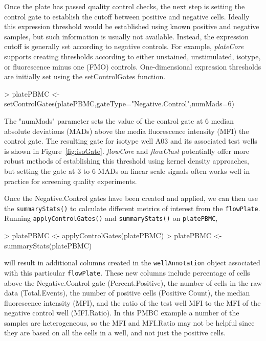 \documentclass[12pt]{article}
\newcommand{\Rfunction}[1]{{\texttt{#1()}}}
\newcommand{\Rclass}[1]{{\texttt{#1}}}
\newcommand{\Robject}[1]{{\texttt{#1}}}
\newcommand{\Rpackage}[1]{{\textit{#1}}}
\begin{document}
\clearpage
Once the plate has passed quality control
checks, the next step is setting the control gate to establish the cutoff between positive and negative cells.
Ideally this expression threshold would be established using known positive and negative samples, but such information is
usually not available. Instead, the expression cutoff is generally set according to negative controls. 
For example, \Rpackage{plateCore} supports creating thresholds according to either unstained, unstimulated, isotype, 
or fluorescence minus one (FMO) controls. One-dimensional expression thresholds are initially set using
the setControlGates function. 
\begin{Schunk}
\begin{Sinput}
> platePBMC <- setControlGates(platePBMC,gateType="Negative.Control",numMads=6)
\end{Sinput}
\end{Schunk}
The "numMads" parameter sets the value of the control gate at 6 median absolute deviations (MADs) above 
the media fluorescence intensity (MFI) the control gate. The resulting gate for isotype well A03 and its
associated test wells is shown in Figure~\ref{fig:isoGate}.
\Rpackage{flowCore} and \Rpackage{flowClust} potentially offer
more robust methods of establishing this threshold using kernel density approaches, but setting the
gate at 3 to 6 MADs on linear scale signals often works well in practice for screening quality experiments.

Once the Negative.Control gates have been created and applied, we can then use the \Rfunction{summaryStats} to calculate different
metrics of interest from the \Rclass{flowPlate}. Running \Rfunction{applyControlGates} and \Rfunction{summaryStats} on \Robject{platePBMC}, 
\begin{Schunk}
\begin{Sinput}
> platePBMC <- applyControlGates(platePBMC)
> platePBMC <- summaryStats(platePBMC)
\end{Sinput}
\end{Schunk}
will result in additional columns created in the \Robject{wellAnnotation} object associated with this
particular \Robject{flowPlate}.  
These new columns include percentage of cells above the Negative.Control gate (Percent.Positive),
the number of cells in the raw data (Total.Events), the number of positive cells (Positive Count),
the median fluorescence intensity (MFI), and the ratio of the test well MFI to the MFI of the negative
control well (MFI.Ratio). In this PMBC example a number of the samples are heterogeneous, so the MFI and MFI.Ratio
may not be helpful since they are based on all the cells in a well, and not just the positive cells.
\end{document}
